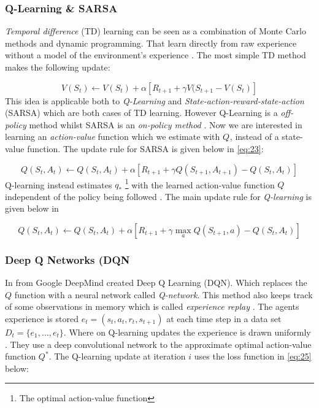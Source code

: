 \documentclass{kththesis}
\theoremstyle{definition}
\begin{document}
\subsubsection*{Q-Learning \& SARSA}
\textit{Temporal difference} (TD) learning can be seen as a combination of Monte Carlo methods and dynamic programming. That learn directly from raw experience without a model of the environment's experience \parencite{sutton1998reinforcement, arulkumaran2017brief}. The most simple TD method makes the following update:

\begin{equation}
    \label{eq:22}
    V(S_t) \leftarrow V(S_t) + \alpha \left[R_{t+1} + \gamma V(S_{t+1} - V(S_t) \right]
\end{equation}
This idea is applicable both to \textit{Q-Learning} and \textit{State-action-reward-state-action} (SARSA) which are both cases of TD learning. However Q-Learning is a \textit{off-policy} method whilst SARSA is an \textit{on-policy method} \parencite{sutton1998reinforcement, arulkumaran2017brief}. Now we are interested in learning an \textit{action-value} function which we estimate with $Q^{}$, instead of a state-value function. The update rule for SARSA is given below in \autoref{eq:23}:

\begin{equation}
    \label{eq:23}
    Q(S_t, A_t) \leftarrow Q(S_t, A_t) + \alpha \left[R_{t+1} + \gamma Q(S_{t+1}, A_{t+1}) - Q(S_t, A_t) \right]
\end{equation}
Q-learning instead estimates  $q_{*}$ \footnote{The optimal action-value function} with the learned action-value function $Q$ independent of the policy being followed \parencite{sutton1998reinforcement}. 
The main update rule for \textit{Q-learning} is given below in 

\begin{equation}
    \label{eq:24}
     Q(S_t, A_t) \leftarrow Q(S_t, A_t) + \alpha \left[R_{t+1} + \gamma \underset{a}{\operatorname{max}} Q(S_{t+1}, a) - Q(S_t, A_t) \right]
\end{equation}

\subsubsection*{Deep Q Networks (DQN}
In \textcite{mnih2015human} from Google DeepMind created Deep Q Learning (DQN). Which replaces the $Q$ function with a neural network called \textit{Q-network}. This method also keeps track of some observations in memory which is called \textit{experience replay} \parencite{mnih2015human}. The agents experience is stored $e_t = (s_t, a_t, r_t, s_{t+1})$ at each time step in a data set $D_t = \{e_1, ..., e_t\}$. Where on Q-learning updates the experience is drawn uniformly \parencite{mnih2015human}. They use a deep convolutional network to the approximate optimal action-value function $Q^{*}$. The Q-learning update at iteration $i$ uses the loss function in \autoref{eq:25} below:
\end{document}
